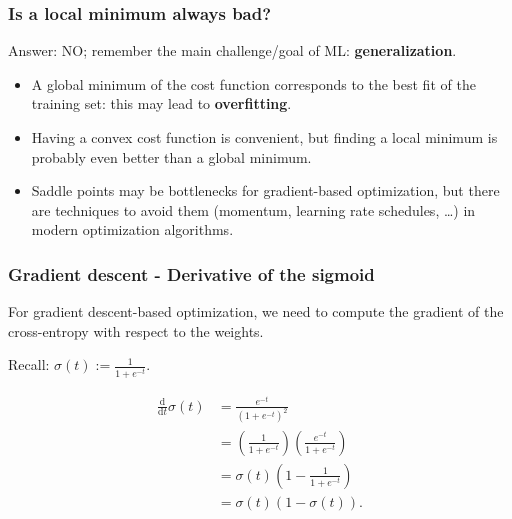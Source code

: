 \documentclass{beamer}
\begin{document}
	\begin{frame}
		\frametitle{Is a local minimum always bad?}
		
		Answer: NO; remember the main challenge/goal of ML: \textbf{generalization}.
		
		\vspace{2mm}
		
		\begin{itemize}
			\item A global minimum of the cost function corresponds to the best fit of the training set: this may lead to \textbf{overfitting}.
			\item Having a convex cost function is convenient, but finding a local minimum is probably even better than a global minimum. 
			\item Saddle points may be bottlenecks for gradient-based optimization, but there are techniques to avoid them (momentum, learning rate schedules, \dots) in modern optimization algorithms.
		\end{itemize}
%		
	\end{frame}

	\begin{frame}
		\frametitle{Gradient descent - Derivative of the sigmoid}
		For gradient descent-based optimization, we need to compute the gradient of the cross-entropy with respect to the weights.
		
		\vspace{5mm}
		
		Recall: $\sigma(t) := \frac{1}{1+e^{-t}}$.
		
		\begin{align*}
			\frac{\textrm{d}}{\textrm{d}t} \sigma(t) &= \frac{e^{-t}}{(1 + e^{-t})^2}\\
			&= \left(\frac{1}{1 + e^{-t}}\right)\left(\frac{e^{-t}}{1 + e^{-t}}\right)\\
			&= \sigma(t)\left(1 - \frac{1}{1 + e^{-t}}\right)\\
			&= \sigma(t)(1 - \sigma(t)).
		\end{align*}
		
	\end{frame}
\end{document}
